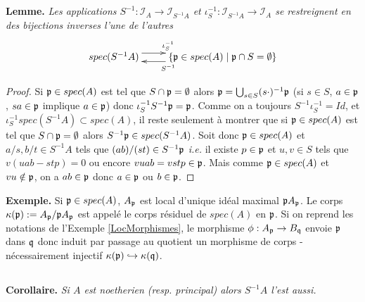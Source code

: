 \documentclass[a4paper, oneside, 12pt]{book}
\theoremstyle{definition} %
\newcommand{\ie}{\textit{i.e.}} %
\begin{document}
\subsection{}\textbf{Lemme.} \textit{Les applications $S^{-1}: \mathcal{I}_A \rightarrow  \mathcal{I}_{S^{-1}A}  $ et  $\iota_S^{-1}: \mathcal{I}_{S^{-1}A} \rightarrow \mathcal{I}_A $ se restreignent en des bijections inverses l'une de l'autres
$$\xymatrix{spec(S^{-1}A) \ar@<1ex>[r]^{\iota_S^{-1}}& \lbrace \frak{p}\in spec(A)\;|\; \frak{p}\cap S=\emptyset\rbrace \ar@<1ex>[l]^{S^{-1}} }$$} 
\begin{proof} Si $\frak{p}\in spec(A)$ est tel que $S\cap \frak{p}=\emptyset$ alors $\frak{p}=\bigcup_{s\in S}(s\cdot)^{-1}\frak{p}$ (si $s\in S$, $a\in \frak{p}$, $sa\in\frak{p}$ implique $a\in\frak{p}$) donc   $\iota_S^{-1}S^{-1}\frak{p}=\frak{p}$. Comme on a toujours $S^{-1}\iota_S^{-1}=Id$, et $\iota_S^{-1}spec(S^{-1}A)\subset spec(A)$, il reste seulement à montrer que si $\frak{p}\in spec(A)$ est tel que $S\cap \frak{p}=\emptyset$ alors  $S^{-1}\frak{p}\in spec(S^{-1}A)$. Soit donc $\frak{p}\in spec(A)$ et $a/s,b/t\in S^{-1}A$ tels que $(ab)/(st)\in S^{-1}\frak{p}$ \ie{} il existe $p\in \frak{p}$ et $u,v\in S$ tels que $v(uab-stp)=0$ ou encore $vuab=vstp\in\frak{p}$. Mais comme $\frak{p}\in spec(A)$ et $vu\notin\frak{p}$, on a $ab\in\frak{p}$ donc $a\in\frak{p}$ ou $b\in\frak{p}$.   \end{proof}

\textbf{Exemple.} Si $\frak{p}\in spec(A)$,  $A_{\frak{p}}$ est local d'unique idéal maximal $\frak{p}A_{\frak{p}}$. Le corps $\kappa(\frak{p}):=A_{\frak{p}}/\frak{p}A_{\frak{p}}$ est appelé le corps résiduel de $spec(A)$ en $\frak{p}$. Si on reprend les notations de l'Exemple \ref{LocMorphismes}, le morphisme $\phi:A_{\frak{p}}\rightarrow B_{\frak{q}}$ envoie $\frak{p}$ dans $\frak{q}$ donc induit par passage au quotient un morphisme de corps - nécessairement injectif $\kappa(\frak{p})\hookrightarrow \kappa(\frak{q})$. \\

 
\subsection{}\textbf{Corollaire.} \textit{Si $A$ est noetherien (resp. principal) alors $S^{-1}A$ l'est aussi.}
 
\end{document}
